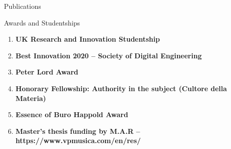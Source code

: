 \documentclass{resume}
\begin{document}
\begin{rSection}{Publications}
    
\end{rSection}

\begin{rSection}{Awards and Studentships}
\begin{enumerate}[leftmargin=0.45cm, itemsep=0em, topsep=0.5em, parsep=0.2em]
    \item
    \textbf{UK Research and Innovation Studentship}
    \item
    \textbf{Best Innovation 2020 – Society of Digital Engineering}
    \item
    \textbf{Peter Lord Award}
    \item
    \textbf{Honorary Fellowship: Authority in the subject (Cultore della Materia)}
    \item
    \textbf{Essence of Buro Happold Award}
    \item
    \textbf{Master’s thesis funding by M.A.R – https://www.vpmusica.com/en/res/}
\end{enumerate}
\end{rSection}
\end{document}
